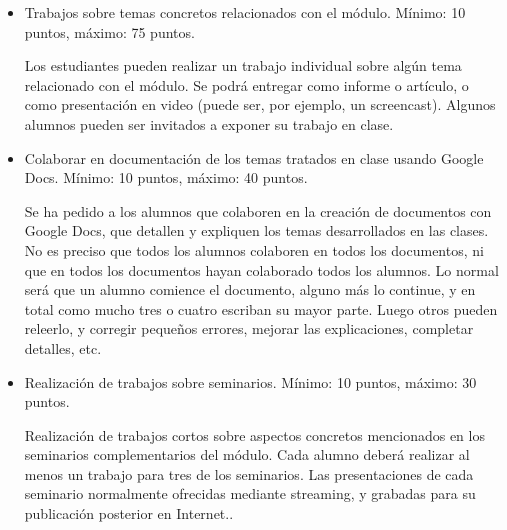 \documentclass[a4paper,12pt]{article}
\begin{document}
\begin{itemize}


\item Trabajos sobre temas concretos relacionados con el módulo. Mínimo: 10 puntos, máximo: 75 puntos.

Los estudiantes pueden realizar un trabajo individual sobre algún tema relacionado con el módulo. Se podrá entregar como informe o artículo, o como presentación en video (puede ser, por ejemplo, un screencast). Algunos alumnos pueden ser invitados a exponer su trabajo en clase.



\item Colaborar en documentación de los temas tratados en clase usando Google Docs. Mínimo: 10 puntos, máximo: 40 puntos.

Se ha pedido a los alumnos que colaboren en la creación de documentos con Google Docs, que detallen y expliquen los temas desarrollados en las clases. No es preciso que todos los alumnos colaboren en todos los documentos, ni que en todos los documentos hayan colaborado todos los alumnos. Lo normal será que un alumno comience el documento, alguno más lo continue, y en total como mucho tres o cuatro escriban su mayor parte. Luego otros pueden releerlo, y corregir pequeños errores, mejorar las explicaciones, completar detalles, etc.

\item Realización de trabajos sobre seminarios. Mínimo: 10 puntos, máximo: 30 puntos.

Realización de trabajos cortos sobre aspectos concretos mencionados en los seminarios complementarios del módulo. Cada alumno deberá realizar al menos un trabajo para tres de los seminarios. Las presentaciones de cada seminario normalmente ofrecidas mediante streaming, y grabadas para su publicación posterior en Internet..


\end{itemize}
\end{document}
